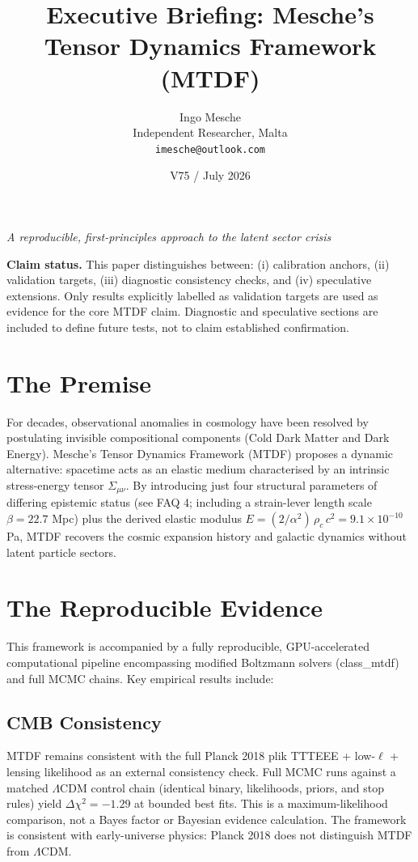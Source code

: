 \documentclass[11pt,a4paper]{article}
\title{Executive Briefing: Mesche's Tensor Dynamics Framework (MTDF)}
\author{Ingo Mesche\\ \small Independent Researcher, Malta \\ \small \texttt{imesche@outlook.com}}
\date{V75 / July 2026}
\begin{document}
\maketitle
\begin{center}\itshape A reproducible, first-principles approach to the latent sector crisis\end{center}



\begin{mdframed}[linecolor=accent,linewidth=0.5pt,backgroundcolor=callout-bg,leftline=true,rightline=true,topline=true,bottomline=true,innerleftmargin=8pt,innerrightmargin=8pt,innertopmargin=6pt,innerbottommargin=6pt]
\textbf{Claim status.}
This paper distinguishes between:
(i) calibration anchors,
(ii) validation targets,
(iii) diagnostic consistency checks, and
(iv) speculative extensions.
Only results explicitly labelled as validation targets are used as evidence for the core MTDF claim. Diagnostic and speculative sections are included to define future tests, not to claim established confirmation.
\end{mdframed}

\section{The Premise}
For decades, observational anomalies in cosmology have been resolved by postulating invisible compositional components (Cold Dark Matter and Dark Energy). Mesche's Tensor Dynamics Framework (MTDF) proposes a dynamic alternative: spacetime acts as an elastic medium characterised by an intrinsic stress-energy tensor $\Sigma_{\mu\nu}$. By introducing just four structural parameters of differing epistemic status (see FAQ 4; including a strain-lever length scale $\beta = 22.7$ Mpc) plus the derived elastic modulus $E = (2/\alpha^2)\,\rho_c\,c^2 = 9.1 \times 10^{-10}$ Pa, MTDF recovers the cosmic expansion history and galactic dynamics without latent particle sectors.

\section{The Reproducible Evidence}
This framework is accompanied by a fully reproducible, GPU-accelerated computational pipeline encompassing modified Boltzmann solvers (class\_\allowbreak{}mtdf) and full MCMC chains. Key empirical results include:

\subsection{CMB Consistency}
MTDF remains consistent with the full Planck 2018 plik TTTEEE + low-$\ell$ + lensing likelihood as an external consistency check. Full MCMC runs against a matched $\Lambda$CDM control chain (identical binary, likelihoods, priors, and stop rules) yield $\Delta\chi^2 = -1.29$ at bounded best fits. This is a maximum-likelihood comparison, not a Bayes factor or Bayesian evidence calculation. The framework is consistent with early-universe physics: Planck 2018 does not distinguish MTDF from $\Lambda$CDM.
\end{document}
